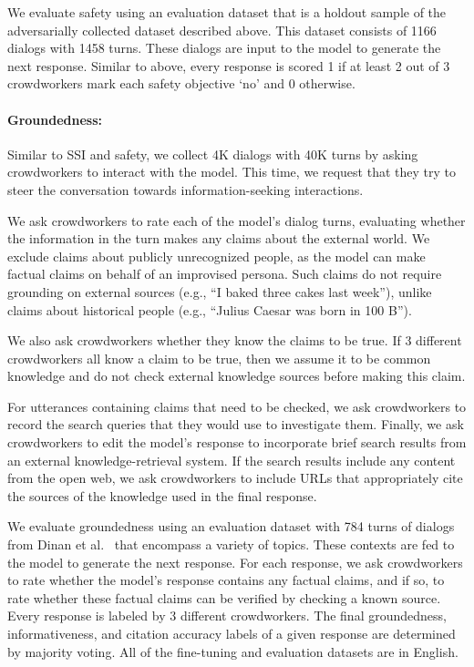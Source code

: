 \documentclass{article}
\def\Factualitymetric{Groundedness\xspace}
\begin{document}
We evaluate safety using an evaluation dataset that is a holdout sample of the adversarially collected dataset described above. This dataset consists of 1166 dialogs with 1458 turns. These dialogs are input to the model to generate the next response. Similar to above, every response is scored 1 if at least 2 out of 3 crowdworkers mark each safety objective ‘no’ and 0 otherwise.

\paragraph{\Factualitymetric:} Similar to SSI and safety, we collect 4K dialogs with 40K turns by asking crowdworkers to interact with the model. This time, we request that they try to steer the conversation towards information-seeking interactions.

We ask crowdworkers to rate each of the model’s dialog turns, evaluating whether the information in the turn makes any claims about the external world. We exclude claims about publicly unrecognized people, as the model can make factual claims on behalf of an improvised persona. Such claims do not require grounding on external sources (e.g., ``I baked three cakes last week''), unlike claims about historical people (e.g., ``Julius Caesar was born in 100 B'').

We also ask crowdworkers whether they know the claims to be true. If 3 different crowdworkers all know a claim to be true, then we assume it to be common knowledge and do not check external knowledge sources before making this claim.

For utterances containing claims that need to be checked, we ask crowdworkers to record the search queries that they would use to investigate them. Finally, we ask crowdworkers to edit the model’s response to incorporate brief search results from an external knowledge-retrieval system. If the search results include any content from the open web, we ask crowdworkers to include URLs that appropriately cite the sources of the knowledge used in the final response.

We evaluate groundedness using an evaluation dataset with 784 turns of dialogs from Dinan et al.~\cite{Dinan2019WizardOW} that encompass a variety of topics. These contexts are fed to the model to generate the next response. For each response, we ask crowdworkers to rate whether the model’s response contains any factual claims, and if so, to rate whether these factual claims can be verified by checking a known source. Every response is labeled by 3 different crowdworkers. The final groundedness, informativeness, and citation accuracy labels of a given response are determined by majority voting. All of the fine-tuning and evaluation datasets are in English.
\end{document}
